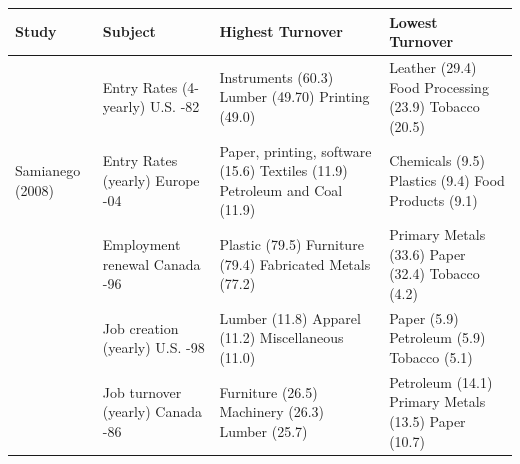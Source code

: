 \documentclass[a4paper,12pt]{article}
\begin{document}
\begin{center}
\begin{table}\label{tb:market_lit}
\begin{tabular}{|P{2.8cm}|P{4cm}|P{4cm}|P{4cm}|}
\hline
\textbf{Study}  &  \textbf{Subject}  &  \textbf{Highest Turnover}  & \textbf{Lowest Turnover} \\
\hline 
\hline
\citet{Dunne1988} & Entry Rates (4-yearly) \newline U.S. -82    & Instruments (60.3) \newline Lumber (49.70) \newline Printing (49.0)  & Leather (29.4) \newline  Food Processing (23.9) \newline Tobacco (20.5) \\  
\hline
Samianego (2008)   & Entry Rates (yearly)  \newline Europe -04  & Paper, printing, software (15.6) \newline Textiles (11.9) \newline Petroleum and Coal (11.9) & Chemicals (9.5) \newline Plastics (9.4) \newline Food Products (9.1) \\
\hline 
\citet{Brown2004}  & Employment renewal    \newline Canada -96  & Plastic (79.5) \newline Furniture (79.4) \newline Fabricated Metals (77.2) & Primary Metals (33.6) \newline Paper (32.4) \newline Tobacco (4.2) \\
\hline
\citet{Foster2006} & Job creation (yearly) \newline U.S. -98     & Lumber (11.8) \newline Apparel (11.2) \newline Miscellaneous (11.0) & Paper (5.9) \newline Petroleum (5.9) \newline Tobacco (5.1) \\
\hline
\citet{Baldwin1994} & Job turnover (yearly) \newline Canada -86 & Furniture (26.5) \newline Machinery (26.3) \newline Lumber (25.7) & Petroleum (14.1) \newline Primary Metals (13.5) \newline Paper (10.7)  \\

\end{tabular}
\end{table}
\end{center}
\end{document}
